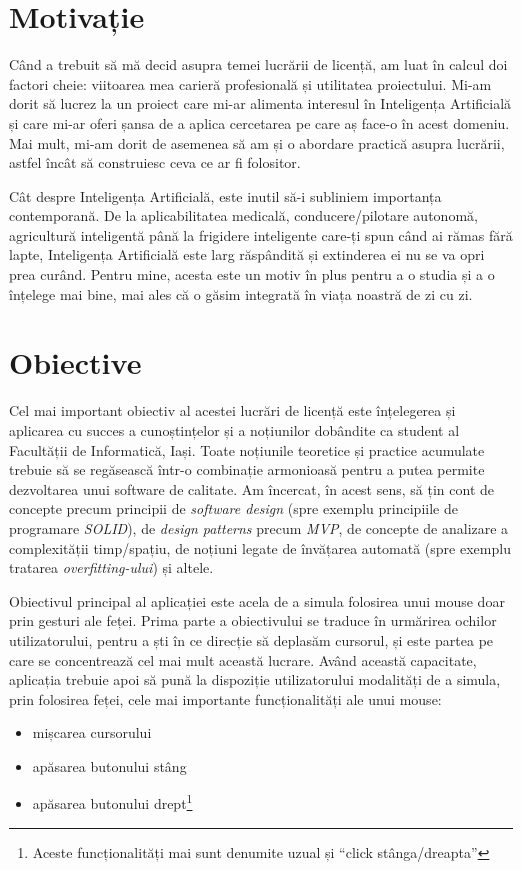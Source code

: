 \section*{Motivație}

Când a trebuit să mă decid asupra temei lucrării de licență, am luat în calcul doi factori cheie: viitoarea mea carieră profesională și utilitatea proiectului.
Mi-am dorit să lucrez la un proiect care mi-ar alimenta interesul în Inteligența Artificială și care mi-ar oferi șansa de a aplica cercetarea pe care aș face-o în acest domeniu.
Mai mult, mi-am dorit de asemenea să am și o abordare practică asupra lucrării, astfel încât să construiesc ceva ce ar fi folositor.

Cât despre Inteligența Artificială, este inutil să-i subliniem importanța contemporană.
De la aplicabilitatea medicală, conducere/pilotare autonomă, agricultură inteligentă până la frigidere inteligente care-ți spun când ai rămas fără lapte, Inteligența Artificială este larg răspândită și extinderea ei nu se va opri prea curând.
Pentru mine, acesta este un motiv în plus pentru a o studia și a o înțelege mai bine, mai ales că o găsim integrată în viața noastră de zi cu zi.

\section*{Obiective}
Cel mai important obiectiv al acestei lucrări de licență este înțelegerea și aplicarea cu succes a cunoștințelor și a noțiunilor dobândite ca student al Facultății de Informatică, Iași.
Toate noțiunile teoretice și practice acumulate trebuie să se regăsească într-o combinație armonioasă pentru a putea permite dezvoltarea unui software de calitate.
Am încercat, în acest sens, să țin cont de concepte precum principii de \emph{software design} (spre exemplu principiile de programare \emph{SOLID}), de \emph{design patterns} precum \emph{MVP}, de concepte de analizare a complexității timp/spațiu, de noțiuni legate de învățarea automată (spre exemplu tratarea \emph{overfitting-ului}) și altele.

Obiectivul principal al aplicației este acela de a simula folosirea unui mouse doar prin gesturi ale feței.
Prima parte a obiectivului se traduce în urmărirea ochilor utilizatorului, pentru a ști în ce direcție să deplasăm cursorul, și este partea pe care se concentrează cel mai mult această lucrare.
Având această capacitate, aplicația trebuie apoi să pună la dispoziție utilizatorului modalități de a simula, prin folosirea feței, cele mai importante funcționalități ale unui mouse:
\begin{itemize}
    \item mișcarea cursorului
    \item apăsarea butonului stâng
    \item apăsarea butonului drept\footnote{Aceste funcționalități mai sunt denumite uzual și ``click stânga/dreapta''}
\end{itemize}


